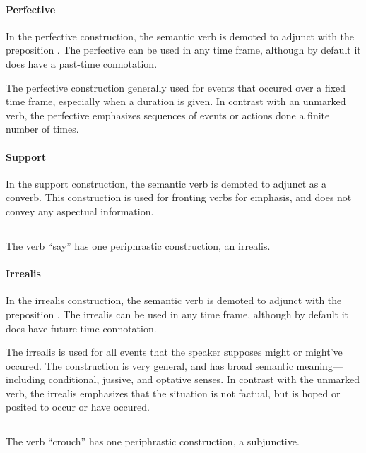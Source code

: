 \paragraph{Perfective}
In the perfective construction, the semantic verb is demoted to adjunct with the preposition . The perfective can be used in any time frame, although by default it does have a past-time connotation.

The perfective construction generally used for events that occured over a fixed time frame, especially when a duration is given. In contrast with an unmarked verb, the perfective emphasizes sequences of events or actions done a finite number of times.

\paragraph{Support}
In the support construction, the semantic verb is demoted to adjunct as a converb. This construction is used for fronting verbs for emphasis, and does not convey any aspectual information.

\subsection{}
The verb  “say” has one periphrastic construction, an irrealis.

\paragraph{Irrealis}
In the irrealis construction, the semantic verb is demoted to adjunct with the preposition . The irrealis can be used in any time frame, although by default it does have future-time connotation.

The irrealis is used for all events that the speaker supposes might or might've occured. The construction is very general, and has broad semantic meaning---including conditional, jussive, and optative senses. In contrast with the unmarked verb, the irrealis emphasizes that the situation is not factual, but is hoped or posited to occur or have occured.

\subsection{}
The verb  “crouch” has one periphrastic construction, a subjunctive.

